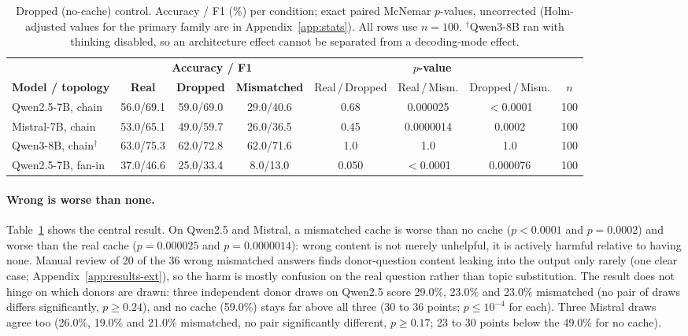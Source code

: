 \documentclass[11pt]{article}
\begin{document}
\begin{table}[t]
\centering
\small
\caption{Dropped (no-cache) control. Accuracy / F1 (\%) per condition; exact
paired McNemar $p$-values, uncorrected (Holm-adjusted values for the
primary family are in Appendix~\ref{app:stats}). All rows use
$n{=}100$. $^\dagger$Qwen3-8B ran with thinking disabled, so an
architecture effect cannot be separated from a decoding-mode effect.}
\label{tab:no_relay}
\begin{tabular}{lccccccc}
\toprule
 & \multicolumn{3}{c}{\textbf{Accuracy / F1}} & \multicolumn{3}{c}{\textbf{$p$-value}} & \\
\cmidrule(lr){2-4}\cmidrule(lr){5-7}
\textbf{Model / topology} & \textcolor{realblue}{\textbf{Real}} & \textbf{Dropped} & \textcolor{wrongred}{\textbf{Mismatched}} & Real\,/\,Dropped & Real\,/\,Mism. & Dropped\,/\,Mism. & $n$ \\
\midrule
Qwen2.5-7B, chain        & 56.0/69.1 & 59.0/69.0 & 29.0/40.6 & 0.68  & 0.000025 & $<$0.0001 & 100 \\
Mistral-7B, chain        & 53.0/65.1 & 49.0/59.7 & 26.0/36.5 & 0.45  & 0.0000014 & 0.0002   & 100 \\
Qwen3-8B, chain$^\dagger$& 63.0/75.3 & 62.0/72.8 & 62.0/71.6 & 1.0   & 1.0      & 1.0       & 100 \\
\midrule
Qwen2.5-7B, fan-in       & 37.0/46.6 & 25.0/33.4 & 8.0/13.0  & 0.050 & $<$0.0001 & 0.000076 & 100 \\
\bottomrule
\end{tabular}
\end{table}

\paragraph{Wrong is worse than none.} Table~\ref{tab:no_relay} shows the
central result. On Qwen2.5 and Mistral, a mismatched cache is worse than
no cache ($p<0.0001$ and $p=0.0002$) and worse than the real cache
($p=0.000025$ and $p=0.0000014$): wrong content is not merely unhelpful,
it is actively harmful relative to having none. Manual review of 20 of the
36 wrong mismatched answers finds donor-question content leaking into the
output only rarely (one clear case; Appendix~\ref{app:results-ext}), so
the harm is mostly confusion on the real question rather than topic
substitution. The result does not hinge on which donors are drawn: three
independent donor draws on Qwen2.5 score 29.0\%, 23.0\% and 23.0\% mismatched (no
pair of draws differs significantly, $p\ge0.24$), and no cache (59.0\%) stays far
above all three (30 to 36 points; $p\le10^{-4}$ for each). Three Mistral draws
agree too (26.0\%, 19.0\% and 21.0\% mismatched, no pair significantly different,
$p\ge0.17$; 23 to 30 points below the 49.0\% for no cache).
\end{document}
